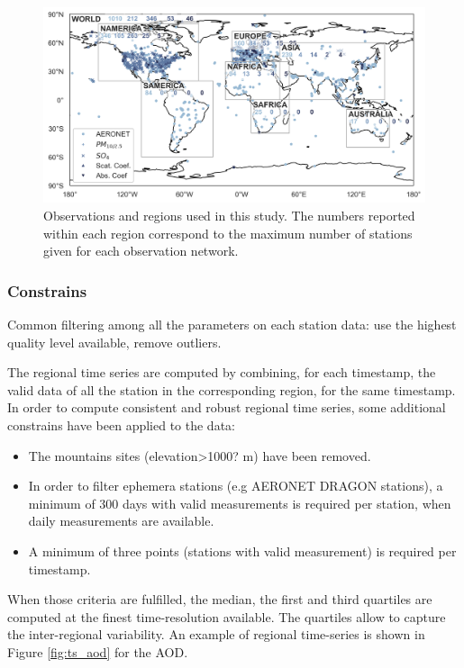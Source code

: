 \documentclass[journal abbreviation, manuscript]{copernicus}
\begin{document}
\begin{figure}
 \includegraphics[width=12cm]{../scripts/figs/maps/av_obs.png}
 \caption{Observations and regions used in this study. The numbers reported within each region correspond to the maximum number of stations given for each observation network.}
 \label{fig:map_obs}
\end{figure}

\subsubsection{Constrains}
Common filtering among all the parameters on each station data: use the highest quality level available, remove outliers.

The regional time series are computed by combining, for each timestamp, the valid data of all the station in the corresponding region, for the same timestamp.
In order to compute consistent and robust regional time series, some additional constrains have been applied to the data:
\begin{itemize}
 \item The mountains sites (elevation>1000? m) have been removed.
 \item In order to filter ephemera stations (e.g AERONET DRAGON stations), a minimum of 300 days with valid measurements is required per station, when daily measurements are available.
 \item A minimum of three points (stations with valid measurement) is required per timestamp.
\end{itemize}

When those criteria are fulfilled, the median, the first and third quartiles are computed at the finest time-resolution available. The quartiles allow to capture the inter-regional variability. An example of regional time-series is shown in Figure \ref{fig:ts_aod} for the AOD.
\end{document}
